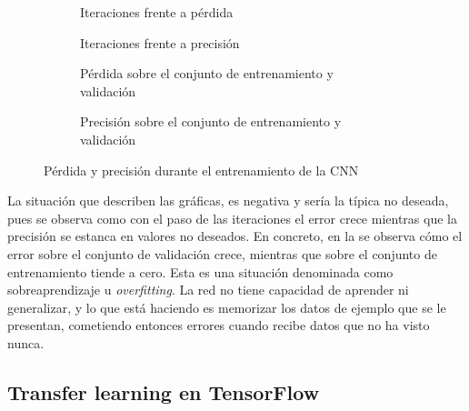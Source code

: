 			\begin{figure}[!h]
				\centering
				\begin{subfigure}{.4\textwidth}
					\centering
					
					\caption{Iteraciones frente a pérdida}
					\label{fig:tb_cnn_a}
				\end{subfigure}\hfill
				\begin{subfigure}{.4\textwidth}
					\centering
					
					\caption{Iteraciones frente a precisión}
					\label{fig:tb_cnn_b}
				\end{subfigure}
				\begin{subfigure}{.4\textwidth}
					\centering
					
					\caption{Pérdida sobre el conjunto de entrenamiento y validación}
					\label{fig:tb_cnn_c}
				\end{subfigure}\hfill
				\begin{subfigure}{.4\textwidth}
					\centering
					
					\caption{Precisión sobre el conjunto de entrenamiento y validación}
					\label{fig:tb_cnn_d}
				\end{subfigure}
				\caption{Pérdida y precisión durante el entrenamiento de la CNN}
				\label{fig:tb_cnn}
			\end{figure}
			
			La situación que describen las gráficas, es negativa y sería la típica no deseada, pues se observa como con el paso de las iteraciones el error crece mientras que la precisión se estanca en valores no deseados. En concreto, en la  se observa cómo el error sobre el conjunto de validación crece, mientras que sobre el conjunto de entrenamiento tiende a cero. Esta es una situación denominada como sobreaprendizaje u \textit{overfitting}\cite{overfitting}. La red no tiene capacidad de aprender ni generalizar, y lo que está haciendo es memorizar los datos de ejemplo que se le presentan, cometiendo entonces errores cuando recibe datos que no ha visto nunca. 
			
		\subsection{Transfer learning en TensorFlow}
		

